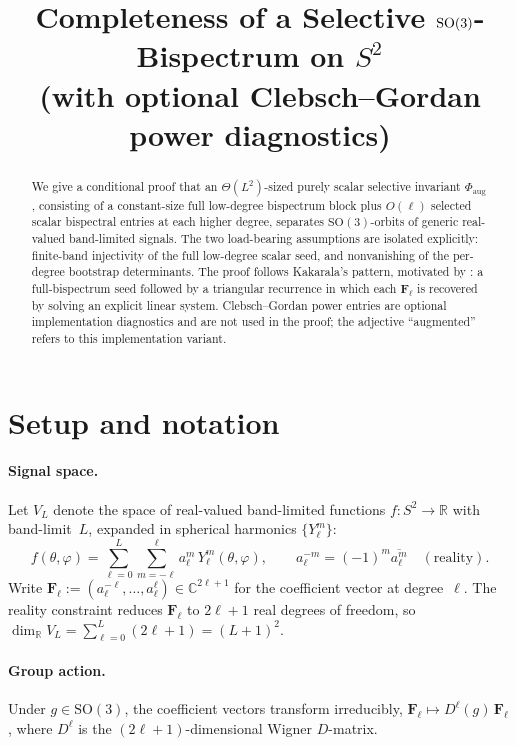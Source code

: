 \documentclass[11pt]{article}
\title{Completeness of a Selective $\SO(3)$-Bispectrum on $S^2$
       \\ (with optional Clebsch--Gordan power diagnostics)}
\author{}
\date{}
\theoremstyle{plain}
\theoremstyle{definition}
\theoremstyle{remark}
\newcommand{\R}{\mathbb{R}}
\newcommand{\C}{\mathbb{C}}
\newcommand{\SO}{\mathrm{SO}}
\newcommand{\SH}{Y}
\newcommand{\conj}[1]{\overline{#1}}
\newcommand{\Phiaug}{\Phi_{\mathrm{aug}}}
\begin{document}
\maketitle

\begin{abstract}
We give a conditional proof that an $\Theta(L^2)$-sized purely scalar
selective invariant $\Phiaug$, consisting of a constant-size full
low-degree bispectrum block plus $O(\ell)$ selected scalar bispectral
entries at each higher degree, separates $\SO(3)$-orbits of generic
real-valued band-limited signals. The two load-bearing assumptions are
isolated explicitly: finite-band injectivity of the full low-degree
scalar seed, and nonvanishing of the per-degree bootstrap
determinants. The proof follows Kakarala's pattern, motivated by
\citet{kakarala1992triple,kakarala2012bispectrum}: a full-bispectrum
seed followed by a triangular recurrence in which each
$\mathbf{F}_\ell$ is recovered by solving an explicit linear system.
Clebsch--Gordan power entries are optional implementation diagnostics
and are not used in the proof; the adjective ``augmented'' refers to
this implementation variant.
\end{abstract}

\section{Setup and notation}
\label{sec:setup}

\paragraph{Signal space.}
Let $V_L$ denote the space of real-valued band-limited functions
$f : S^2 \to \R$ with band-limit~$L$, expanded in spherical harmonics
$\{\SH_\ell^m\}$:
\begin{equation}\label{eq:sh-expansion}
  f(\theta,\varphi)
  = \sum_{\ell=0}^{L}\sum_{m=-\ell}^{\ell}
    a_\ell^m \, \SH_\ell^m(\theta,\varphi),
  \qquad a_\ell^{-m} = (-1)^m \conj{a_\ell^m}
  \quad (\text{reality}).
\end{equation}
Write $\mathbf{F}_\ell := (a_\ell^{-\ell},\dots,a_\ell^{\ell}) \in \C^{2\ell+1}$ for the
coefficient vector at degree~$\ell$. The reality constraint reduces
$\mathbf{F}_\ell$ to $2\ell+1$ real degrees of freedom, so
$\dim_\R V_L = \sum_{\ell=0}^{L}(2\ell+1) = (L+1)^2$.

\paragraph{Group action.}
Under $g\in\SO(3)$, the coefficient vectors transform irreducibly,
$\mathbf{F}_\ell \mapsto D^\ell(g)\,\mathbf{F}_\ell$, where $D^\ell$ is
the $(2\ell+1)$-dimensional Wigner $D$-matrix.
\end{document}
